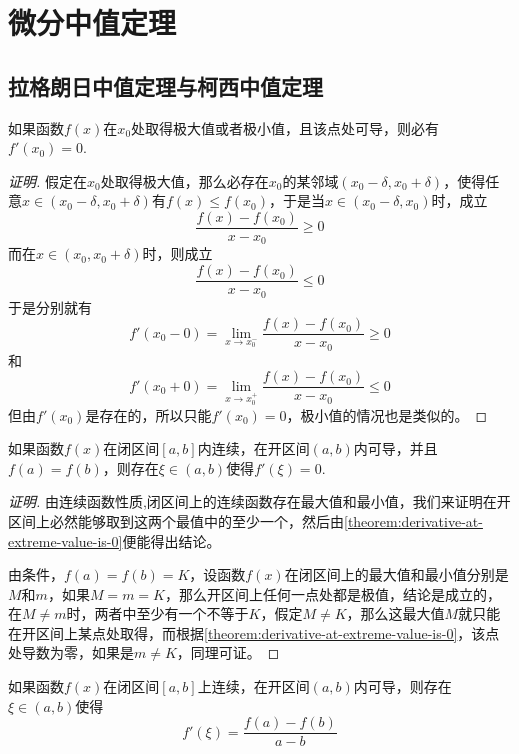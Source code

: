 
\section{微分中值定理}
\label{sec:differential-mean-value-theorems}

\subsection{拉格朗日中值定理与柯西中值定理}
\label{sec:lagrange-and-cauchy-mean-value-theorem}

\begin{theorem}
  \label{theorem:derivative-at-extreme-value-is-0}
  如果函数$f(x)$在$x_0$处取得极大值或者极小值，且该点处可导，则必有$f'(x_0)=0$.
\end{theorem}

\begin{proof}[证明]
  假定在$x_0$处取得极大值，那么必存在$x_0$的某邻域$(x_0-\delta,x_0+\delta)$，使得任意$x \in (x_0-\delta,x_0+\delta)$有$f(x) \leqslant f(x_0)$，于是当$x \in (x_0-\delta, x_0)$时，成立
  \[ \frac{f(x)-f(x_0)}{x-x_0} \geqslant 0 \]
  而在$x \in (x_0,x_0+\delta)$时，则成立
  \[ \frac{f(x)-f(x_0)}{x-x_0} \leqslant 0 \]
  于是分别就有
  \[ f'(x_0-0) = \lim_{x \to x_0^-} \frac{f(x)-f(x_0)}{x-x_0} \geqslant 0 \]
  和
  \[ f'(x_0+0) = \lim_{x \to x_0^+} \frac{f(x)-f(x_0)}{x-x_0} \leqslant 0 \]
  但由$f'(x_0)$是存在的，所以只能$f'(x_0)=0$，极小值的情况也是类似的。
\end{proof}

\begin{theorem}
  如果函数$f(x)$在闭区间$[a,b]$内连续，在开区间$(a,b)$内可导，并且$f(a)=f(b)$，则存在$ \xi \in (a,b)$使得$f'(\xi)=0$.
\end{theorem}

\begin{proof}[证明]
  由连续函数性质,闭区间上的连续函数存在最大值和最小值，我们来证明在开区间上必然能够取到这两个最值中的至少一个，然后由\autoref{theorem:derivative-at-extreme-value-is-0}便能得出结论。

  由条件，$f(a)=f(b)=K$，设函数$f(x)$在闭区间上的最大值和最小值分别是$M$和$m$，如果$M=m=K$，那么开区间上任何一点处都是极值，结论是成立的，在$M \neq m$时，两者中至少有一个不等于$K$，假定$M \neq K$，那么这最大值$M$就只能在开区间上某点处取得，而根据\autoref{theorem:derivative-at-extreme-value-is-0}，该点处导数为零，如果是$m \neq K$，同理可证。
\end{proof}

\begin{theorem}
  如果函数$f(x)$在闭区间$[a,b]$上连续，在开区间$(a,b)$内可导，则存在$\xi \in (a,b)$使得
  \[ f'(\xi) = \frac{f(a)-f(b)}{a-b} \]
\end{theorem}

